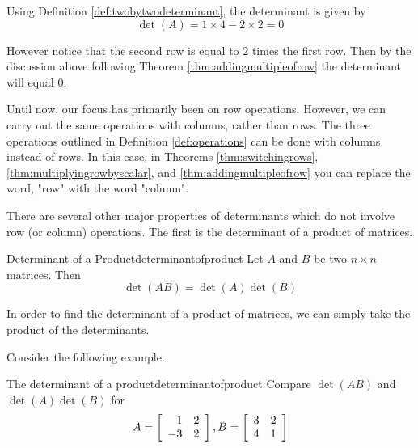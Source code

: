 \begin{solution}
Using Definition \ref{def:twobytwodeterminant}, the determinant is given by
\[
\det \left( A \right) = 1 \times 4 - 2 \times 2 = 0
\]

However notice that the second row is equal to $2$ times the first row. Then by the discussion above following Theorem \ref{thm:addingmultipleofrow} the determinant will equal $0$.
\end{solution}

Until now, our focus has primarily been on row operations. However, we can carry out the 
same operations with columns, rather than rows. The three operations outlined in
Definition \ref{def:operations} can be done with columns instead of rows. 
In this case, in Theorems \ref{thm:switchingrows}, \ref{thm:multiplyingrowbyscalar}, 
and \ref{thm:addingmultipleofrow} you can replace
the word, "row" with the word "column".

There are several other major properties of determinants which do not involve
row (or column) operations. The first is the determinant of a product of matrices. 

\begin{theorem}{Determinant of a Product}{determinantofproduct}
Let $A$ and $B$ be two $n\times n$ matrices. Then
\begin{equation*}
\det \left( AB\right) =\det \left( A\right) \det \left( B\right)
\end{equation*}
\end{theorem}

In order to find the determinant of a product of matrices, we can simply take the product of the determinants. 

Consider the following example.

\begin{example}{The determinant of a product}{determinantofproduct}
Compare $\det \left( AB\right) $ and $\det \left( A\right) \det \left(
B\right) $ for
\begin{equation*}
A=\left[
\begin{array}{rr}
1 & 2 \\
-3 & 2
\end{array}
\right] ,B=\left[
\begin{array}{rr}
3 & 2 \\
4 & 1
\end{array}
\right] 
\end{equation*}
\end{example}

